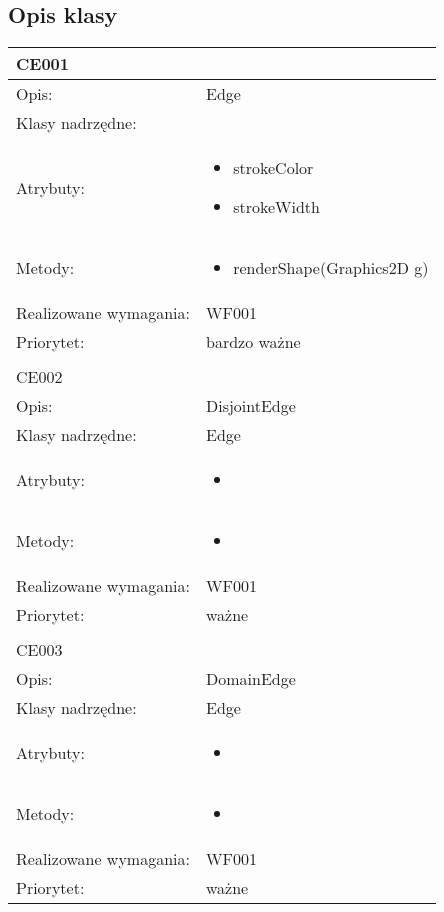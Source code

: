 \documentclass[a4paper,10pt]{article}
\begin{document}
\subsection{Opis klasy}

\begin{center}

\begin{longtable}{|m{3cm}|m{9cm}|} \hline

CE001 &  \\ \hline
Opis: & Edge    \\ \hline
Klasy nadrzędne: &     \\ \hline
Atrybuty: & \begin{itemize}
 \item strokeColor
 \item strokeWidth 
\end{itemize}
 \\ \hline
Metody: & \begin{itemize}
 \item renderShape(Graphics2D g)
\end{itemize}
  \\ \hline
Realizowane wymagania: & WF001 \\ \hline
Priorytet: & bardzo ważne  \\ \hline

\multicolumn{2}{c}{} \\
 \hline

CE002 &  \\ \hline
Opis: & DisjointEdge    \\ \hline
Klasy nadrzędne: & Edge    \\ \hline
Atrybuty: & \begin{itemize}
 \item 
\end{itemize}
 \\ \hline
Metody: & \begin{itemize}
 \item 
\end{itemize}
  \\ \hline
Realizowane wymagania: & WF001 \\ \hline
Priorytet: & ważne  \\ \hline

\multicolumn{2}{c}{} \\
 \hline

CE003 &  \\ \hline
Opis: & DomainEdge    \\ \hline
Klasy nadrzędne: & Edge    \\ \hline
Atrybuty: & \begin{itemize}
 \item 
\end{itemize}
 \\ \hline
Metody: & \begin{itemize}
 \item 
\end{itemize}
  \\ \hline
Realizowane wymagania: & WF001 \\ \hline
Priorytet: & ważne  \\ \hline


\end{longtable}
\end{center}
\end{document}
